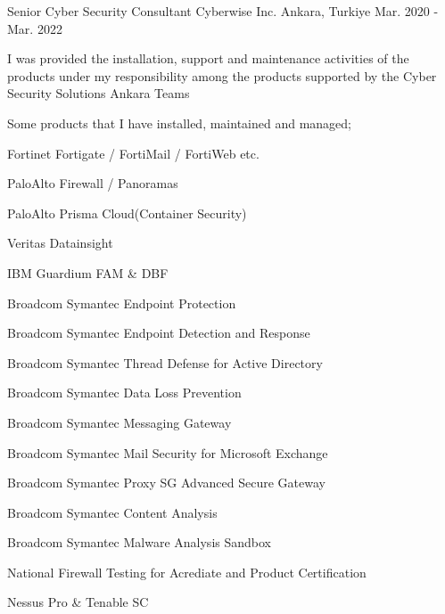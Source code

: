 \begin{cventries}
  \cventry
    {Senior Cyber Security Consultant} %
    {Cyberwise Inc.} %
    {Ankara, Turkiye} %
    {Mar. 2020 - Mar. 2022} %
    {
      \begin{cvitems} %
        \item {I was provided the installation, support and maintenance activities of the products under my responsibility among the products supported by the Cyber Security Solutions Ankara Teams}
        \item {Some products that I have installed, maintained and managed;}
        \item {Fortinet Fortigate / FortiMail / FortiWeb etc.}
        \item {PaloAlto Firewall / Panoramas}
        \item {PaloAlto Prisma Cloud(Container Security)}
        \item {Veritas Datainsight}
        \item {IBM Guardium FAM & DBF}
        \item {Broadcom Symantec Endpoint Protection}
        \item {Broadcom Symantec Endpoint Detection and Response}
        \item {Broadcom Symantec Thread Defense for Active Directory}   
        \item {Broadcom Symantec Data Loss Prevention}
        \item {Broadcom Symantec Messaging Gateway}
        \item {Broadcom Symantec Mail Security for Microsoft Exchange}
        \item {Broadcom Symantec Proxy SG Advanced Secure Gateway}
        \item {Broadcom Symantec Content Analysis}
        \item {Broadcom Symantec Malware Analysis Sandbox}
        \item {National Firewall Testing for Acrediate and Product Certification}
        \item {Nessus Pro & Tenable SC}
        

\end{cvitems}}
\end{cventries}
